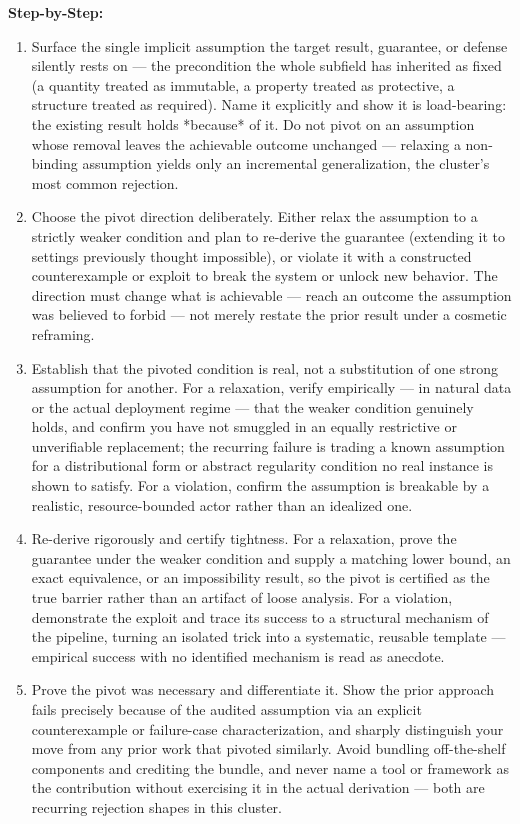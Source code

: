\begin{tcolorbox}
\textbf{Step-by-Step:}
\begin{enumerate}[leftmargin=14pt,topsep=2pt,itemsep=1pt]
  \item Surface the single implicit assumption the target result, guarantee, or defense silently rests on --- the precondition the whole subfield has inherited as fixed (a quantity treated as immutable, a property treated as protective, a structure treated as required). Name it explicitly and show it is load-bearing: the existing result holds *because* of it. Do not pivot on an assumption whose removal leaves the achievable outcome unchanged --- relaxing a non-binding assumption yields only an incremental generalization, the cluster's most common rejection.
  \item Choose the pivot direction deliberately. Either relax the assumption to a strictly weaker condition and plan to re-derive the guarantee (extending it to settings previously thought impossible), or violate it with a constructed counterexample or exploit to break the system or unlock new behavior. The direction must change what is achievable --- reach an outcome the assumption was believed to forbid --- not merely restate the prior result under a cosmetic reframing.
  \item Establish that the pivoted condition is real, not a substitution of one strong assumption for another. For a relaxation, verify empirically --- in natural data or the actual deployment regime --- that the weaker condition genuinely holds, and confirm you have not smuggled in an equally restrictive or unverifiable replacement; the recurring failure is trading a known assumption for a distributional form or abstract regularity condition no real instance is shown to satisfy. For a violation, confirm the assumption is breakable by a realistic, resource-bounded actor rather than an idealized one.
  \item Re-derive rigorously and certify tightness. For a relaxation, prove the guarantee under the weaker condition and supply a matching lower bound, an exact equivalence, or an impossibility result, so the pivot is certified as the true barrier rather than an artifact of loose analysis. For a violation, demonstrate the exploit and trace its success to a structural mechanism of the pipeline, turning an isolated trick into a systematic, reusable template --- empirical success with no identified mechanism is read as anecdote.
  \item Prove the pivot was necessary and differentiate it. Show the prior approach fails precisely because of the audited assumption via an explicit counterexample or failure-case characterization, and sharply distinguish your move from any prior work that pivoted similarly. Avoid bundling off-the-shelf components and crediting the bundle, and never name a tool or framework as the contribution without exercising it in the actual derivation --- both are recurring rejection shapes in this cluster.

\end{enumerate}
\end{tcolorbox}
